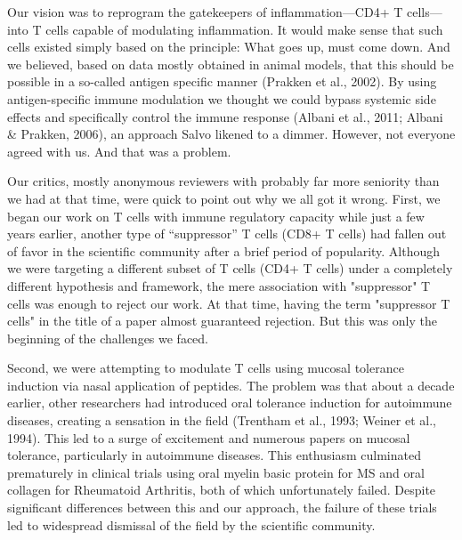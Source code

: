 \documentclass[authordate, editorial, issue]{jote-new-article}
\begin{document}
	Our vision was to reprogram the gatekeepers of inflammation—CD4+ T cells—into T cells capable of modulating inflammation. It would make sense that such cells existed simply based on the principle: What goes up, must come down. And we believed, based on data mostly obtained in animal models, that this should be possible in a so-called antigen specific manner (Prakken et al., 2002). By using antigen-specific immune modulation we thought we could bypass systemic side effects and specifically control the immune response (Albani et al., 2011; Albani \& Prakken, 2006), an approach Salvo likened to a dimmer. However, not everyone agreed with us. And that was a problem.







	Our critics, mostly anonymous reviewers with probably far more seniority than we had at that time, were quick to point out why we all got it wrong. First, we began our work on T cells with immune regulatory capacity while just a few years earlier, another type of “suppressor” T cells (CD8+ T cells) had fallen out of favor in the scientific community after a brief period of popularity. Although we were targeting a different subset of T cells (CD4+ T cells) under a completely different hypothesis and framework, the mere association with "suppressor" T cells was enough to reject our work. At that time, having the term "suppressor T cells" in the title of a paper almost guaranteed rejection. But this was only the beginning of the challenges we faced.







	Second, we were attempting to modulate T cells using mucosal tolerance induction via nasal application of peptides. The problem was that about a decade earlier, other researchers had introduced oral tolerance induction for autoimmune diseases, creating a sensation in the field (Trentham et al., 1993; Weiner et al., 1994). This led to a surge of excitement and numerous papers on mucosal tolerance, particularly in autoimmune diseases. This enthusiasm culminated prematurely in clinical trials using oral myelin basic protein for MS and oral collagen for Rheumatoid Arthritis, both of which unfortunately failed. Despite significant differences between this and our approach, the failure of these trials led to widespread dismissal of the field by the scientific community.
\end{document}

